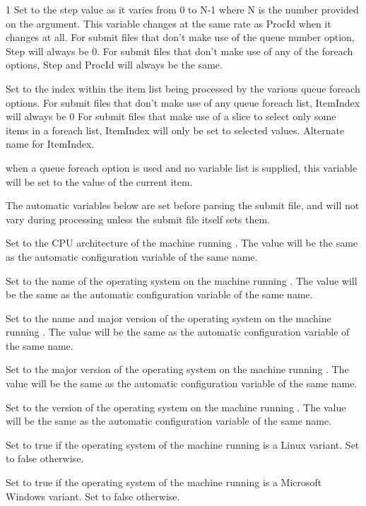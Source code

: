 \begin{ManPage}{\label{man-condor-submit}}{1}
\Item[Step]
Set to the step value as it varies from 0 to N-1 where N is the number provided on the  argument.
This variable changes at the same rate as ProcId when it changes at all.
For submit files that don't make use of the queue number option, Step will always be 0.
For submit files that don't make use of any of the foreach options, Step and ProcId will always be the same.

\Item[ItemIndex]
Set to the index within the item list being processed by the various queue foreach options.
For submit files that don't make use of any queue foreach list, ItemIndex will always be 0
For submit files that make use of a slice to select only some items in a foreach list, ItemIndex will only
be set to selected values.
\Item[Row]
Alternate name for ItemIndex.

\Item[Item]
when a queue foreach option is used and no variable list is supplied, this variable will be set to the
value of the current item.


The automatic variables below are set before parsing the submit file, and will not vary during processing
unless the submit file itself sets them.

\Item[ARCH]
Set to the CPU architecture of the machine running .
The value will be the same as the automatic configuration variable of the same name.

\Item[OPSYS]
Set to the name of the operating system on the machine running .
The value will be the same as the automatic configuration variable of the same name.

\Item[OPSYSANDVER]
Set to the name and major version of the operating system on the machine running .
The value will be the same as the automatic configuration variable of the same name.

\Item[OPSYSMAJORVER]
Set to the major version of the operating system on the machine running .
The value will be the same as the automatic configuration variable of the same name.

\Item[OPSYSVER]
Set to the version of the operating system on the machine running .
The value will be the same as the automatic configuration variable of the same name.

\Item[IsLinux]
Set to true if the operating system of the machine running  is a Linux variant.
Set to false otherwise.

\Item[IsWindows]
Set to true if the operating system of the machine running  is a Microsoft Windows variant.
Set to false otherwise.


\end{ManPage}
